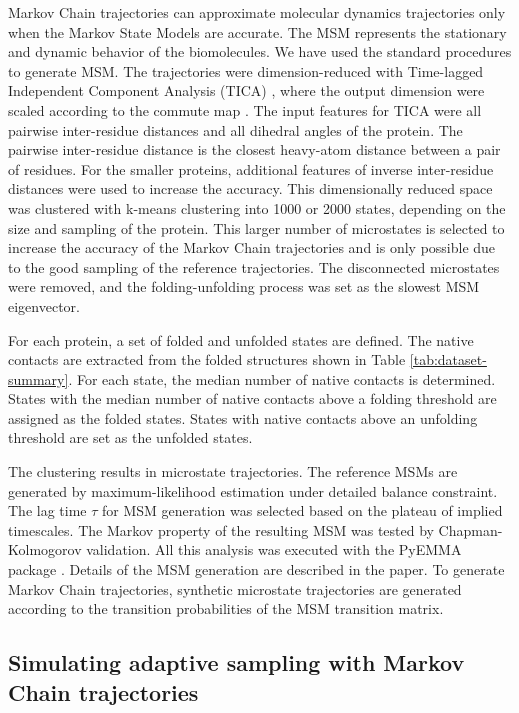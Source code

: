 Markov Chain trajectories can approximate molecular dynamics trajectories only when the Markov State Models are accurate. The MSM represents the stationary and dynamic behavior of the biomolecules. 
We have used the standard procedures to generate MSM. The trajectories were dimension-reduced with Time-lagged Independent Component Analysis (TICA) 
\cite{TICA1-perez2013, TICA2-schwantes2013}, where the output dimension were scaled according to the commute map 
\cite{noe2016commute}. The input features for TICA were all pairwise
inter-residue distances and all dihedral angles of the protein.  The pairwise
inter-residue distance is the closest heavy-atom distance between a pair of residues. 
For the smaller proteins,  additional features of inverse inter-residue distances were used to increase the accuracy. This dimensionally reduced space was clustered with k-means clustering into 1000 or 2000 states, depending on the size and sampling of the protein. This larger number of microstates is selected to increase the accuracy of the Markov Chain trajectories and is only possible due to the good sampling of the reference trajectories. The disconnected microstates were removed, and the folding-unfolding process was set as the slowest MSM eigenvector. 

For each protein, a set of folded and unfolded states are defined. The native contacts are extracted from the folded structures shown in Table \ref{tab:dataset-summary}. For each state, the median number of native
contacts is determined. States with the median number of native contacts above a folding threshold are assigned as the folded states. States with native contacts above an unfolding threshold are set as the unfolded states.

The clustering results in microstate trajectories. The reference MSMs are generated by maximum-likelihood estimation under detailed balance constraint. The lag time $\tau$ for MSM generation was selected based on the plateau of implied timescales. The Markov property of the resulting MSM was tested by Chapman-Kolmogorov validation. All this analysis was executed with the PyEMMA package \cite{scherer2015pyemma}. Details of the MSM generation are described in the paper\cite{Adstrategies2018}. To generate Markov Chain trajectories, synthetic microstate trajectories are generated according to the transition probabilities of the MSM transition matrix.

 

\subsection{\label{sec:level5}Simulating adaptive sampling with Markov Chain trajectories}

